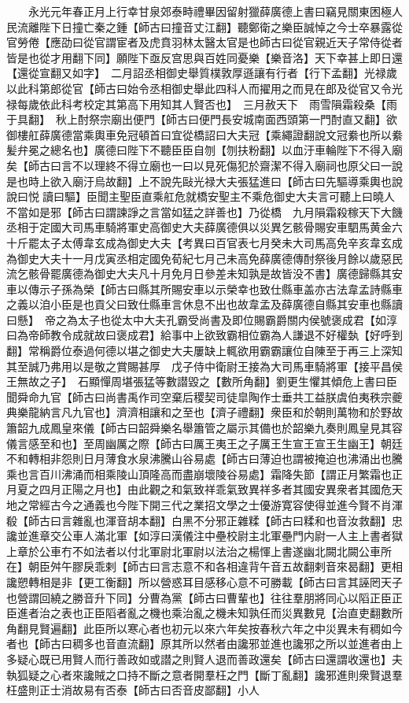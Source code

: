 　　永光元年春正月上行幸甘泉郊泰畤禮畢因留射獵薛廣德上書曰竊見關東困極人民流離陛下日撞亡秦之鍾【師古曰撞音丈江翻】聽鄭衛之樂臣誠悼之今士卒暴露從官勞倦【應劭曰從官謂宦者及虎賁羽林太醫太官是也師古曰從官親近天子常侍從者皆是也從才用翻下同】願陛下亟反宫思與百姓同憂樂【樂音洛】天下幸甚上即日還【還從宣翻又如字】　二月詔丞相御史舉質樸敦厚遜讓有行者【行下孟翻】光禄歲以此科第郎從官【師古曰始令丞相御史舉此四科人而擢用之而見在郎及從官又令光禄每歲依此科考校定其第高下用知其人賢否也】　三月赦天下　雨雪隕霜殺桑【雨于具翻】　秋上酎祭宗廟出便門【師古曰便門長安城南面西頭第一門酎直又翻】欲御樓舡薛廣德當乘輿車免冠頓首曰宜從橋詔曰大夫冠【乘繩證翻說文冠絭也所以絭髪弁冕之總名也】廣德曰陛下不聽臣臣自刎【刎扶粉翻】以血汙車輪陛下不得入廟矣【師古曰言不以理終不得立廟也一曰以見死傷犯於齋潔不得入廟祠也原父曰一說是也時上欲入廟汙烏故翻】上不說先敺光禄大夫張猛進曰【師古曰先驅導乘輿也說說曰悦讀曰驅】臣聞主聖臣直乘舡危就橋安聖主不乘危御史大夫言可聽上曰曉人不當如是邪【師古曰謂諫諍之言當如猛之詳善也】乃從橋　九月隕霜殺稼天下大饑丞相于定國大司馬車騎將軍史高御史大夫薛廣德俱以災異乞骸骨賜安車駟馬黄金六十斤罷太子太傅韋玄成為御史大夫【考異曰百官表七月癸未大司馬高免辛亥韋玄成為御史大夫十一月戊寅丞相定國免荀紀七月己未高免薛廣德傳酎祭後月餘以歲惡民流乞骸骨罷廣德為御史大夫凡十月免月日參差未知孰是故皆没不書】廣德歸縣其安車以傳示子孫為榮【師古曰縣其所賜安車以示榮幸也致仕縣車盖亦古法韋孟詩縣車之義以洎小臣是也貢父曰致仕縣車言休息不出也故韋孟及薛廣德自縣其安車也縣讀曰懸】　帝之為太子也從太中大夫孔霸受尚書及即位賜霸爵關内侯號褒成君【如淳曰為帝師教令成就故曰褒成君】給事中上欲致霸相位霸為人謙退不好權埶【好呼到翻】常稱爵位泰過何德以堪之御史大夫屢缺上輒欲用霸霸讓位自陳至于再三上深知其至誠乃弗用以是敬之賞賜甚厚　戊子侍中衛尉王接為大司馬車騎將軍【接平昌侯王無故之子】　石顯憚周堪張猛等數譛毀之【數所角翻】劉更生懼其傾危上書曰臣聞舜命九官【師古曰尚書禹作司空棄后稷契司徒皐陶作士垂共工益朕虞伯夷秩宗夔典樂龍納言凡九官也】濟濟相讓和之至也【濟子禮翻】衆臣和於朝則萬物和於野故簫韶九成鳳皇來儀【師古曰韶舜樂名舉簫管之屬示其備也於韶樂九奏則鳳皇見其容儀言感至和也】至周幽厲之際【師古曰厲王夷王之子厲王生宣王宣王生幽王】朝廷不和轉相非怨則日月薄食水泉沸騰山谷易處【師古曰薄迫也謂被掩迫也沸涌出也騰乘也言百川沸涌而相乘陵山頂隆高而盡崩壞陵谷易處】霜降失節【謂正月繁霜也正月夏之四月正陽之月也】由此觀之和氣致祥乖氣致異祥多者其國安異衆者其國危天地之常經古今之通義也今陛下開三代之業招文學之士優游寛容使得並進今賢不肖渾殽【師古曰言雜亂也渾音胡本翻】白黑不分邪正雜糅【師古曰糅和也音汝救翻】忠讒並進章交公車人滿北軍【如淳曰漢儀注中壘校尉主北軍壘門内尉一人主上書者獄上章於公車冇不如法者以付北軍尉北軍尉以法治之楊惲上書遂幽北闕北闕公車所在】朝臣舛午膠戾乖剌【師古曰言志意不和各相違背午音五故翻剌音來曷翻】更相讒愬轉相是非【更工衡翻】所以營惑耳目感移心意不可勝載【師古曰言其誣罔天子也營謂回繞之勝音升下同】分曹為黨【師古曰曹輩也】往往羣朋將同心以䧟正臣正臣進者治之表也正臣䧟者亂之機也乘治亂之機未知孰任而災異數見【治直吏翻數所角翻見賢遍翻】此臣所以寒心者也初元以來六年矣按春秋六年之中災異未有稠如今者也【師古曰稠多也音直流翻】原其所以然者由讒邪並進也讒邪之所以並進者由上多疑心既已用賢人而行善政如或譛之則賢人退而善政還矣【師古曰還謂收還也】夫執狐疑之心者來讒賊之口持不斷之意者開羣枉之門【斷丁亂翻】讒邪進則衆賢退羣枉盛則正士消故易有否泰【師古曰否音皮鄙翻】小人